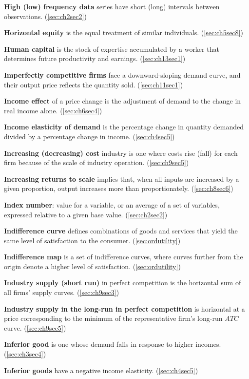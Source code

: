 \textbf{High (low) frequency data} series have short (long) intervals between observations. (\ref{sec:ch2sec2})

\textbf{Horizontal equity} is the equal treatment of similar individuals. (\ref{sec:ch5sec8})

\textbf{Human capital} is the stock of expertise accumulated by a worker that determines future productivity and earnings. (\ref{sec:ch13sec1})

\textbf{Imperfectly competitive firms} face a downward-sloping demand curve, and their output price reflects the quantity sold. (\ref{sec:ch11sec1})

\textbf{Income effect} of a price change is the adjustment of demand to the change in real income alone. (\ref{sec:ch6sec4})

\textbf{Income elasticity of demand} is the percentage change in quantity demanded divided by a percentage change in income. (\ref{sec:ch4sec5})

\textbf{Increasing (decreasing) cost} industry is one where costs rise (fall) for each firm because of the scale of industry operation. (\ref{sec:ch9sec5})

\textbf{Increasing returns to scale} implies that, when all inputs are increased by a given proportion, output increases more than proportionately. (\ref{sec:ch8sec6})

\textbf{Index number}: value for a variable, or an average of a set of variables, expressed relative to a given base value. (\ref{sec:ch2sec2})

\textbf{Indifference curve} defines combinations of goods and services that yield the same level of satisfaction to the consumer. (\ref{sec:ordutility})

\textbf{Indifference map} is a set of indifference curves, where curves further from the origin denote a higher level of satisfaction. (\ref{sec:ordutility})

\textbf{Industry supply (short run)} in perfect competition is the horizontal sum of all firms' supply curves. (\ref{sec:ch9sec3})

\textbf{Industry supply in the long-run in perfect competition} is horizontal at a price corresponding to the minimum of the representative firm's long-run $ATC$ curve. (\ref{sec:ch9sec5})

\textbf{Inferior good} is one whose demand falls in response to higher incomes. (\ref{sec:ch3sec4})

\textbf{Inferior goods} have a negative income elasticity. (\ref{sec:ch4sec5})

